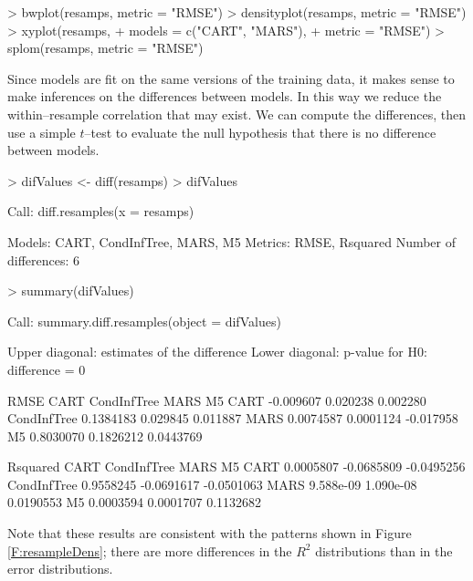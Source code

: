 \documentclass[12pt]{article}
\begin{document}
\begin{Schunk}
\begin{Sinput}
> bwplot(resamps, metric = "RMSE")
> densityplot(resamps, metric = "RMSE")
> xyplot(resamps,
+        models = c("CART", "MARS"),
+        metric = "RMSE")
> splom(resamps, metric = "RMSE")
\end{Sinput}
\end{Schunk}



Since models are fit on the same versions of the training data, it makes sense to make inferences on the differences between models. In this way we reduce the within--resample correlation that may exist. We can compute the differences, then use a simple $t$--test to evaluate the null hypothesis that there is no difference between models.

\begin{Schunk}
\begin{Sinput}
> difValues <- diff(resamps)
> difValues
\end{Sinput}
\begin{Soutput}
Call:
diff.resamples(x = resamps)

Models: CART, CondInfTree, MARS, M5 
Metrics: RMSE, Rsquared 
Number of differences: 6 
\end{Soutput}
\begin{Sinput}
> summary(difValues)
\end{Sinput}
\begin{Soutput}
Call:
summary.diff.resamples(object = difValues)

Upper diagonal: estimates of the difference
Lower diagonal: p-value for H0: difference = 0

RMSE 
            CART      CondInfTree MARS      M5       
CART                  -0.009607    0.020238  0.002280
CondInfTree 0.1384183              0.029845  0.011887
MARS        0.0074587 0.0001124             -0.017958
M5          0.8030070 0.1826212   0.0443769          

Rsquared 
            CART      CondInfTree MARS       M5        
CART                   0.0005807  -0.0685809 -0.0495256
CondInfTree 0.9558245             -0.0691617 -0.0501063
MARS        9.588e-09 1.090e-08               0.0190553
M5          0.0003594 0.0001707   0.1132682            
\end{Soutput}
\end{Schunk}
Note that these results are consistent with the patterns shown in
Figure \ref{F:resampleDens}; there are more differences in the $R^2$
distributions than in the error distributions.
\end{document}
